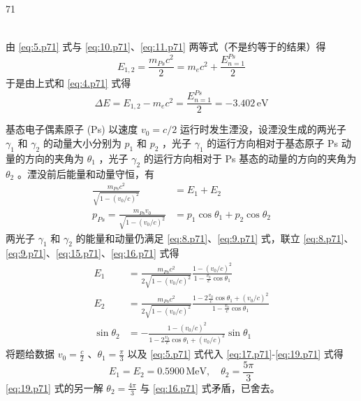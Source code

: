 \begin{solution}{71}
\begin{subsolution}
\begin{subsubsolution}
\begin{align}
            \end{align}
        \end{subsubsolution}
        \begin{subsubsolution}
            由 \eqref{eq:5.p71} 式与 \eqref{eq:10.p71}、\eqref{eq:11.p71} 两等式（不是约等于的结果）得
            \begin{equation*}
                E_{1,2} = \frac{m_{Ps}c^{2}}{2} = m_{e}c^{2} + \frac{E_{n=1}^{Ps}}{2}
            \end{equation*}
            于是由上式和 \eqref{eq:4.p71} 式得
            \begin{equation}
                \Delta E = E_{1,2} - m_{e}c^{2} = \frac{E_{n=1}^{Ps}}{2} = -3.402\,\mathrm{eV} \label{eq:14.p71}
            \end{equation}
        \end{subsubsolution}
    \end{subsolution}
    \begin{subsolution}
        基态电子偶素原子 (Ps) 以速度 $v_{0} = c/2$ 运行时发生湮没，设湮没生成的两光子 $\gamma_{1}$ 和 $\gamma_{2}$ 的动量大小分别为 $p_{1}$ 和 $p_{2}$ ，光子 $\gamma_{1}$ 的运行方向相对于基态原子 Ps 动量的方向的夹角为 $\theta_{1}$ ，光子 $\gamma_{2}$ 的运行方向相对于 Ps 基态的动量的方向的夹角为 $\theta_{2}$ 。湮没前后能量和动量守恒，有
        \begin{align}
            \frac{m_{Ps}c^{2}}{\sqrt{1 - (v_{0}/c)^{2}}} &= E_{1} + E_{2} \label{eq:15.p71} \\
            p_{Ps} = \frac{m_{Ps}v_{0}}{\sqrt{1 - (v_{0}/c)^{2}}} &= p_{1}\cos\theta_{1} + p_{2}\cos\theta_{2} \label{eq:16.p71}
        \end{align}
        两光子 $\gamma_{1}$ 和 $\gamma_{2}$ 的能量和动量仍满足 \eqref{eq:8.p71}、\eqref{eq:9.p71} 式，联立 \eqref{eq:8.p71}、\eqref{eq:9.p71}、\eqref{eq:15.p71}、\eqref{eq:16.p71} 式得
        \begin{align}
            E_{1} &= \frac{m_{Ps}c^{2}}{2\sqrt{1 - (v_{0}/c)^{2}}} \frac{1 - (v_{0}/c)^{2}}{1 - \frac{v_{0}}{c}\cos\theta_{1}} \label{eq:17.p71} \\
            E_{2} &= \frac{m_{Ps}c^{2}}{2\sqrt{1 - (v_{0}/c)^{2}}} \frac{1 - 2\frac{v_{0}}{c}\cos\theta_{1} + (v_{0}/c)^{2}}{1 - \frac{v_{0}}{c}\cos\theta_{1}} \label{eq:18.p71} \\
            \sin\theta_{2} &= -\frac{1 - (v_{0}/c)^{2}}{1 - 2\frac{v_{0}}{c}\cos\theta_{1} + (v_{0}/c)^{2}} \sin\theta_{1} \label{eq:19.p71}
        \end{align}
        将题给数据 $v_{0} = \frac{c}{2}$ 、$\theta_{1} = \frac{\pi}{3}$ 以及 \eqref{eq:5.p71} 式代入 \eqref{eq:17.p71}-\eqref{eq:19.p71} 式得
        \begin{equation}
            E_{1} = E_{2} = 0.5900\,\mathrm{MeV},\quad \theta_{2} = \frac{5\pi}{3} \label{eq:20.p71}
        \end{equation}
        \eqref{eq:19.p71} 式的另一解 $\theta_{2} = \frac{4\pi}{3}$ 与 \eqref{eq:16.p71} 式矛盾，已舍去。
    \end{subsolution}
\end{solution}
